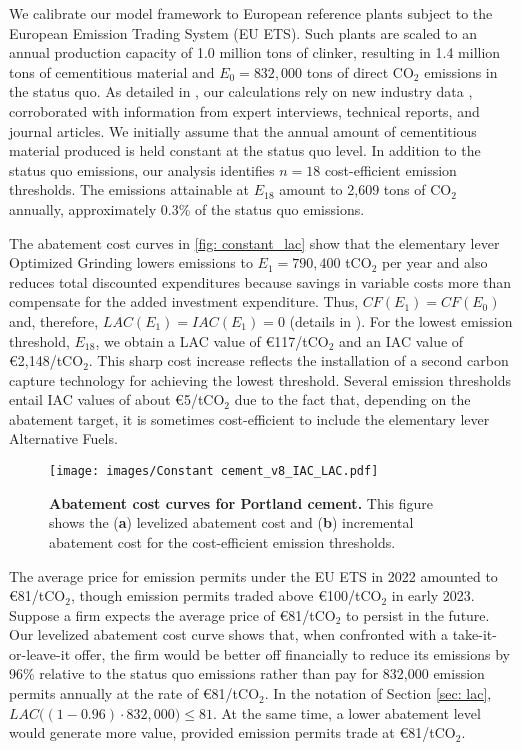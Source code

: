 \documentclass[12pt, a4paper]{article} %
\newcommand{\methods}{\nameref{sec: methods}} %
\begin{document}
We calibrate our model framework to European reference plants subject to the European Emission Trading System (EU ETS). Such plants are scaled to an annual production capacity of 1.0 million tons of clinker, resulting in 1.4 million tons of cementitious material and $E_0 = 832,000$ tons of direct CO$_2$ emissions in the status quo. As detailed in \methods, our calculations rely on new industry data \citep{ecra2022state}, corroborated with information from expert interviews, technical reports, and journal articles. We initially assume that the annual amount of cementitious material produced is held constant at the status quo level. In addition to the status quo emissions, our analysis identifies $n = 18$ cost-efficient emission thresholds. The emissions attainable at $E_{18}$ amount to 2,609 tons of CO$_2$ annually, approximately 0.3\% of the status quo emissions.

The abatement cost curves in \autoref{fig: constant_lac} show that the elementary lever Optimized Grinding lowers emissions to $E_1 = 790,400$ tCO$_2$ per year and also reduces total discounted expenditures because savings in variable costs more than compensate for the added investment expenditure. Thus, $CF(E_1) = CF(E_0)$ and, therefore, $LAC(E_1) = IAC(E_1) = 0$ (details in \methods). For the lowest emission threshold, $E_{18}$, we obtain a LAC value of \euro 117/tCO$_2$ and an IAC value of \euro 2,148/tCO$_2$. This sharp cost increase reflects the installation of a second carbon capture technology for achieving the lowest threshold. Several emission thresholds entail IAC values of about \euro 5/tCO$_2$ due to the fact that, depending on the abatement target, it is sometimes cost-efficient to include the elementary lever Alternative Fuels.

\begin{figure}[ht]
\centering
\texttt{[image: images/Constant cement\_v8\_IAC\_LAC.pdf]}
\caption{\textbf{Abatement cost curves for Portland cement.} This figure shows the (\textbf{a}) levelized abatement cost and (\textbf{b}) incremental abatement cost for the cost-efficient emission thresholds.}
\label{fig: constant_lac}
\end{figure}

The average price for emission permits under the EU ETS in 2022 amounted to \euro 81/tCO$_2$, though emission permits traded above \euro 100/tCO$_2$ in early 2023. Suppose a firm expects the average price of \euro 81/tCO$_2$ to persist in the future. Our levelized abatement cost curve shows that, when confronted with a take-it-or-leave-it offer, the firm would be better off financially to reduce its emissions by 96\% relative to the status quo emissions rather than pay for 832,000 emission permits annually at the rate of \euro 81/tCO$_2$. In the notation of Section \ref{sec: lac}, $LAC\bigl((1-0.96)\cdot 832,000\bigr) \leq 81$. At the same time, a lower abatement level would generate more value, provided emission permits trade at \euro 81/tCO$_2$.
\end{document}
